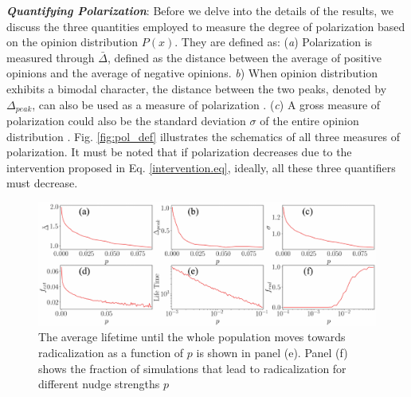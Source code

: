 \documentclass[%
 reprint,
superscriptaddress,
 amsmath,amssymb,
 aps,
 pre,
]{revtex4-1}
\begin{document}
{\it \textbf{Quantifying Polarization}}: Before we delve into the details of the results, we discuss the three quantities employed to measure the degree of polarization based on the opinion distribution $P(x)$. They are defined as: ({\it a}) Polarization is measured through $\bar \Delta$, defined as the distance between the average of positive opinions and the average of negative opinions. {\it b}) When opinion distribution exhibits a bimodal character, the distance between the two peaks, denoted by $\Delta_{peak}$, can also be used as a measure of polarization \cite{depolarization-of-echo-chambers-by-random-dynamical-nudge}.
({\it c}) A gross measure of polarization could also be the standard deviation $\sigma$ of the entire opinion distribution \cite{link-recommendation-algorithms-and-dynamics-of-polarization-in-social-networks}. Fig. \ref{fig:pol_def} illustrates the schematics of all three measures of polarization. It must be noted that if polarization decreases due to the intervention proposed in Eq. \ref{intervention.eq}, ideally, all these three quantifiers must decrease.


\begin{figure}[ht]
    \includegraphics[width=\textwidth]{new_pol_param.pdf}
    \caption{ The average lifetime until the whole population moves towards radicalization as a function of $p$ is shown in panel (e). Panel (f) shows the fraction of simulations that lead to radicalization for different nudge strengths $p$}
    \label{fig:pol_par}
\end{figure}
\end{document}
